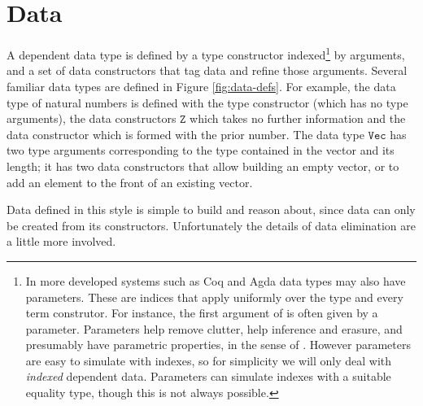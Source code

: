 \section{Data}


A dependent data type is defined by a type constructor indexed\footnote{
 In more developed systems such as Coq and Agda data types may also have parameters.
 These are indices that apply uniformly over the type and every term construtor.
 For instance, the first argument of \Vect{} is often given by a parameter.
 Parameters help remove clutter, help inference and erasure, and presumably have parametric properties, in the sense of \cite{10.1145/99370.99404}.
 However parameters are easy to simulate with indexes, so for simplicity we will only deal with \emph{indexed} dependent data.
 Parameters can simulate indexes with a suitable equality type\cite{sjoberg2012irrelevance}, though this is not always possible\cite[Section 8]{bertrand:hal-02896776}.
} by arguments, and a set of data constructors that tag data and refine those arguments.
Several familiar data types are defined in Figure \ref{fig:data-defs}.
For example, the data type of natural numbers is defined with the type constructor \Nat{} (which has no type arguments), the data constructors $\mathtt{Z}$ which takes no further information and the data constructor \Suc which is formed with the prior number.
The data type $\mathtt{Vec}$ has two type arguments corresponding to the type contained in the vector and its length; it has two data constructors that allow building an empty vector, or to add an element to the front of an existing vector.

Data defined in this style is simple to build and reason about, since data can only be created from its constructors.
Unfortunately the details of data elimination are a little more involved.

